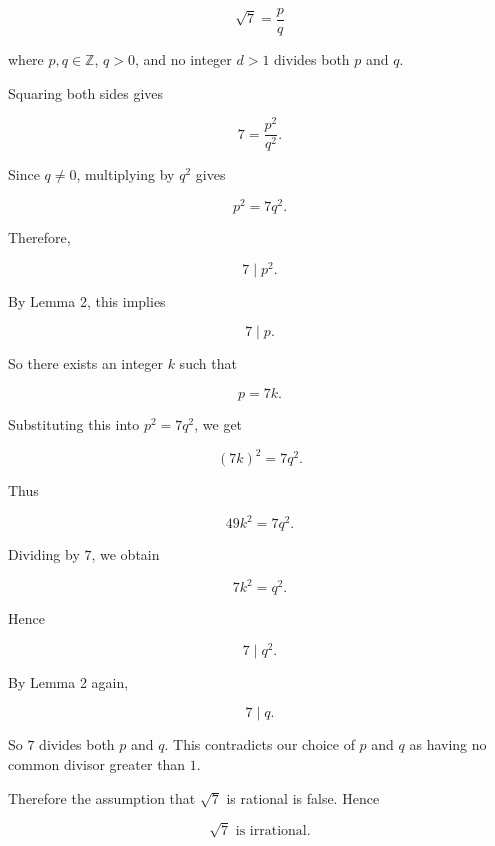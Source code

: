 \[
\sqrt{7}=\frac{p}{q}
\]

where \(p,q\in \mathbb{Z}\), \(q>0\), and no integer \(d>1\) divides both \(p\) and \(q\).

Squaring both sides gives

\[
7=\frac{p^2}{q^2}.
\]

Since \(q\neq 0\), multiplying by \(q^2\) gives

\[
p^2=7q^2.
\]

Therefore,

\[
7\mid p^2.
\]

By Lemma 2, this implies

\[
7\mid p.
\]

So there exists an integer \(k\) such that

\[
p=7k.
\]

Substituting this into \(p^2=7q^2\), we get

\[
(7k)^2=7q^2.
\]

Thus

\[
49k^2=7q^2.
\]

Dividing by \(7\), we obtain

\[
7k^2=q^2.
\]

Hence

\[
7\mid q^2.
\]

By Lemma 2 again,

\[
7\mid q.
\]

So \(7\) divides both \(p\) and \(q\). This contradicts our choice of \(p\) and \(q\) as having no common divisor greater than \(1\).

Therefore the assumption that \(\sqrt{7}\) is rational is false. Hence

\[
\boxed{\sqrt{7}\text{ is irrational}.}
\]